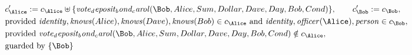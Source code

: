 \begin{align*}
&
c'_
{
\Alice
}
 := 
c_
{
\Alice
}
 \uplus 
\{
\mathit{
vote_deposit_bond_carol
}
(
\Bob
,
Alice
,
Sum
,
Dollar
,
Dave
,
Day
,
Bob
,
Cond
)
\}
, \qquad 
c'_
{
\Bob
}
 := 
c_
{
\Bob
}
,\\
&
\text{provided } 
\mathit{
identity
}
,
\mathit{
knows
}
(
Alice
)
,
\mathit{
knows
}
(
Dave
)
,
\mathit{
knows
}
(
Bob
)
 \in c_
{
\Alice
}
 \text{ and } 
\mathit{
identity
}
,
\mathit{
officer
}
(
\Alice
)
,
\mathit{
person
}
 \in c_
{
\Bob
}
,\\
&
\text{provided } 
\mathit{
vote_deposit_bond_carol
}
(
\Bob
,
Alice
,
Sum
,
Dollar
,
Dave
,
Day
,
Bob
,
Cond
)
 \notin c_
{
\Alice
}
,\\
&
\text{guarded by } \{
\Bob
\}
\end{align*}

